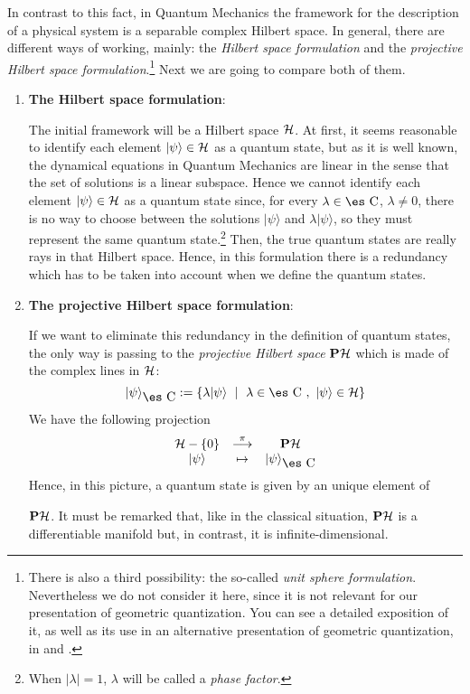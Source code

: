 \documentclass[12pt]{article}
\def\mapping#1{\mathrel{\mathop{\longrightarrow}\limits^{#1}}}
\def\H{{\cal H}}
\def\sta{|\psi \rangle }
\def\Complex{\mbox{\es C}}
\begin{document}
In contrast to this fact,
in Quantum Mechanics the framework for the description of a physical
system
is a separable complex Hilbert space.
In general, there are different ways of working, mainly: the {\it
Hilbert space formulation}
and the {\it projective Hilbert space formulation}.\footnote{
There is also a third possibility:
the so-called {\it unit sphere formulation}.
Nevertheless we do not consider it here,
since it is not relevant for our presentation
of geometric quantization.
You can see a detailed exposition of it,
as well as its use in an alternative
presentation of geometric quantization, in
\cite{Tu-85} and \cite{Tu-96}.
}
Next we are going to compare both of them.
\begin{enumerate}
\item
{\bf The Hilbert space formulation}:

The initial framework will be a Hilbert space $\H$.
At first, it seems reasonable to identify each element
$\sta \in \H$ as a quantum state, but as it is well known,
the dynamical equations in Quantum Mechanics are linear
in the sense that the set of solutions is a linear subspace.
Hence  we cannot identify each element $\sta \in \H$ as a quantum state
since,
for every $\lambda \in \Complex$, $\lambda \not= 0$,
there is no way to choose between the solutions
$\sta$ and $\lambda\sta$, so they must represent the same quantum state.\footnote{
When $\mid \lambda \mid = 1$,
$\lambda$ will be called a {\it phase factor}.
}
Then, the true quantum states are really rays in that Hilbert space.
Hence, in this formulation there is a redundancy which has to be
taken into account when we define the quantum states.
\item
{\bf The projective Hilbert space formulation}:

If we want to eliminate this redundancy in the definition of quantum
states,
the only way is passing to the {\it projective Hilbert space}
${\bf P}\H$ which is made of the complex lines in $\H$:
$$
\sta_{\Complex} := \{ \lambda \sta \ \mid \ \lambda \in \Complex
\ , \ \sta \in \H \}
$$
We have the following projection
$$
\begin{array}{ccc}
\H -\{ 0 \} & \mapping{\pi} & {\bf P}\H
\\
\sta & \mapsto & \sta_{\Complex}
\end{array}
$$
Hence, in this picture, a quantum state is given by an unique element of

${\bf P}\H$.
It must be remarked that, like in the classical situation,
${\bf P}\H$ is a differentiable manifold but, in contrast, it is
infinite-dimensional.
\end{enumerate}
\end{document}
